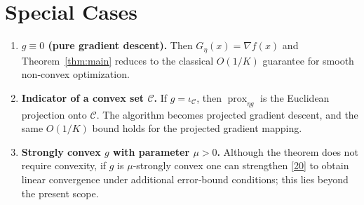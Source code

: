 \documentclass{article}
\newcommand{\prox}{\operatorname{prox}}
\newcommand{\grad}{\nabla}
\begin{document}
\section*{Special Cases}
\begin{enumerate}
\item \textbf{$g\equiv0$ (pure gradient descent).} Then $G_{\eta}(x)=\grad f(x)$ and Theorem~\ref{thm:main} reduces to the classical $O(1/K)$ guarantee for smooth non‑convex optimization.
\item \textbf{Indicator of a convex set $\mathcal{C}$.} If $g=\iota_{\mathcal{C}}$, then $\prox_{\eta g}$ is the Euclidean projection onto $\mathcal{C}$. The algorithm becomes projected gradient descent, and the same $O(1/K)$ bound holds for the projected gradient mapping.
\item \textbf{Strongly convex $g$ with parameter $\mu>0$.} Although the theorem does not require convexity, if $g$ is $\mu$‑strongly convex one can strengthen \eqref{20} to obtain linear convergence under additional error‑bound conditions; this lies beyond the present scope.
\end{enumerate}
\end{document}
